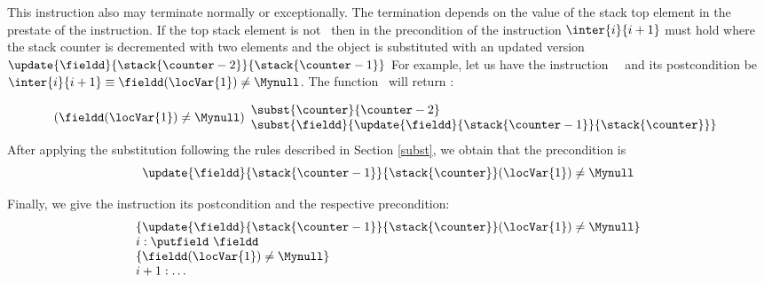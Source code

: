 \begin{itemize}
\begin{enumerate}
			                This instruction  also may terminate normally or exceptionally. The termination depends on the value of the stack 
					top element in the prestate of the instruction. If the top stack element is not \Mynull \ then in the precondition
					of the instruction $\inter{i}{i+1}$ must hold where the stack counter is decremented with two elements and
					the \fieldd object is substituted with an updated version $\update{\fieldd}{ \stack{\counter - 2}}{  \stack{\counter  -1} } $
					For example, let us have the instruction \putfield \ \fieldd \ and its postcondition be
					$ \inter{i}{i+1} \equiv \fieldd( \locVar{1})  \neq \Mynull $. The function \fwpi \ will return : 
					 
					$$
					 (\fieldd( \locVar{1})  \neq \Mynull  )
					          \begin{array}{l} 
					                     \subst{ \counter }{  \counter -2 } \\
							     \subst{  \fieldd}{ \update{\fieldd}{ \stack{\counter - 1}}{  \stack{\counter } } }
                                             	  \end{array}
					$$
					After applying the substitution following the rules 
					described in Section \ref{subst}, we obtain that the precondition is 
					$$ \update{\fieldd}{ \stack{\counter - 1} }{\stack{\counter} }( \locVar{1})  \neq \Mynull  $$
					
					Finally, we give the instruction \putfield its postcondition and the respective precondition:
					$$ \begin{array}{l}
					  \{ \update{\fieldd}{ \stack{\counter - 1} }{\stack{\counter} }( \locVar{1})  \neq \Mynull \}  \\
					   
					  i: \putfield  \ \fieldd\\
					  \{\fieldd( \locVar{1})  \neq \Mynull \} \\
					  i+1: \ldots 
					\end{array}
					$$
					

\end{enumerate}
\end{itemize}
